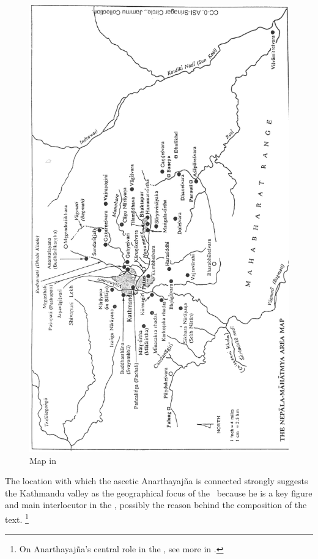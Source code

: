 \begin{figure}[!]
\includegraphics[scale=.43]{images/map_in_jayaraj.png}
\caption[Map in ]{Map in 
\label{fig:map02}}
\end{figure}


The location with which the ascetic Anarthayajña
is connected strongly suggests the Kathmandu 
valley as the geographical focus of the \VSS\
because he is a key figure and 
main interlocutor in the \VSS,
possibly the reason behind the composition of the text.%
	\footnote{On Anarthayajña's central role in the \VSS,
			see more in .}


